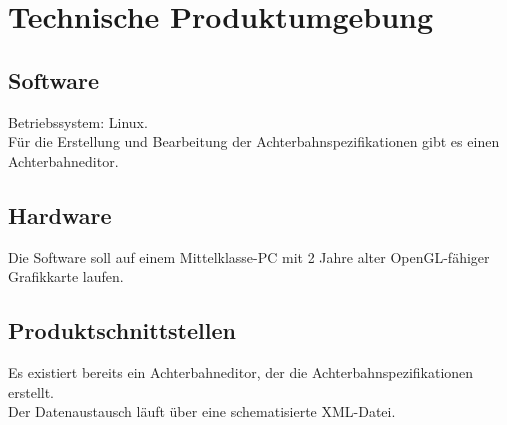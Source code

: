 
\chapter{Technische Produktumgebung}

\section{Software}
Betriebssystem: Linux.\\
Für die Erstellung und Bearbeitung der Achterbahnspezifikationen gibt es einen Achterbahneditor.\\


\section{Hardware}
Die Software soll auf einem Mittelklasse-PC mit 2 Jahre alter OpenGL-fähiger Grafikkarte laufen.




\newpage

\section{Produktschnittstellen}
Es existiert bereits ein Achterbahneditor, der die Achterbahnspezifikationen erstellt.\\
Der Datenaustausch läuft über eine schematisierte XML-Datei.

